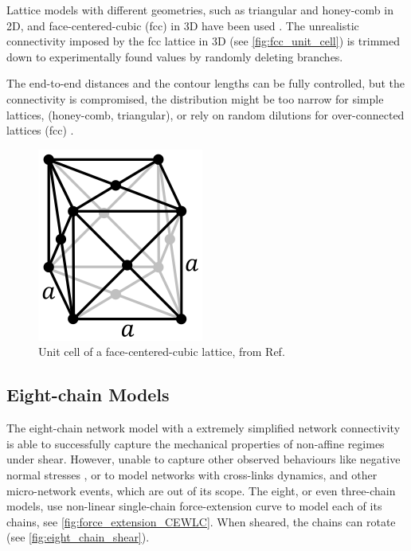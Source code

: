 Lattice models with different geometries, such as triangular and honey-comb in 2D, and face-centered-cubic (fcc) in 3D have been used \cite{broedersz_filament-length-controlled_2012,ronceray_fiber_2015, vahabi_elasticity_2016, sharma_strain-controlled_2016}. The unrealistic connectivity imposed by the fcc lattice in 3D (see \autoref{fig:fcc_unit_cell}) is trimmed down to experimentally found values by randomly deleting branches.

The end-to-end distances and the contour lengths can be fully controlled, but the connectivity is compromised, the distribution might be too narrow for simple lattices, (honey-comb, triangular), or rely on random dilutions for over-connected lattices (fcc) \cite{sharma_strain-controlled_2016}.

\begin{figure}[ht]
  \centering
  \includegraphics[width=0.3\linewidth]{Figures/chapter-intro/fcc_lattice_wiki.png}
  \caption{Unit cell of a face-centered-cubic lattice, from Ref. \cite{_cubic_2018}}
  \label{fig:fcc_unit_cell}
\end{figure}

\subsection{Eight-chain Models}%
\label{sub:eight_chain_models}

The eight-chain network model \cite{palmer_constitutive_2008, meng_nonlinear_2016} with a extremely simplified network connectivity is able to successfully capture the mechanical properties of non-affine regimes under shear. However, unable to capture other observed behaviours like negative normal stresses \cite{janmey_negative_2006}, or to model networks with cross-links dynamics, and other micro-network events, which are out of its scope.
The eight, or even three-chain models, use non-linear single-chain force-extension curve to model each of its chains, see \autoref{fig:force_extension_CEWLC}. When sheared, the chains can rotate (see \autoref{fig:eight_chain_shear}).

